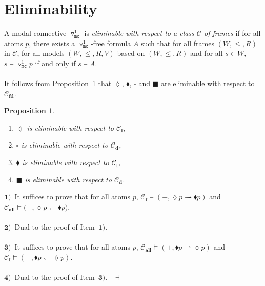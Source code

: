 \documentclass[draft]{article}
\newtheorem{proposition}{Proposition}
\newenvironment{proof}{{\bf Proof:}}{~$\dashv$\\}
\def\allfra{\mathbf{all}}
\def\fcfra{\mathbf{f}}
\def\fdcfra{\mathbf{fd}}
\def\dcfra{\mathbf{d}}
\begin{document}
\section{Eliminability}\label{section:expressivity}
%
%
A modal connective $\triangledown_{\mathtt{mc}}^{1}$ is {\em eliminable with respect to a class ${\mathcal C}$ of frames}\/ if for all atoms $p$, there exists a $\triangledown_{\mathtt{mc}}^{1}$-free formula $A$ such that for all frames $(W,{\leq},{R})$ in ${\mathcal C}$, for all models $(W,{\leq},{R},V)$ based on $(W,{\leq},{R})$ and for all $s{\in}W$, $s{\models}{\triangledown_{\mathtt{mc}}^{1}}p$ if and only if $s{\models}A$.
%
%
\\
\\
%
%
It follows from Proposition~\ref{interdefinable:1} that $\lozenge$, $\blacklozenge$, $\square$ and $\blacksquare$ are eliminable with respect to ${\mathcal C}_{\fdcfra}$.
%
%
\begin{proposition}\label{interdefinable:1}
%
%
\begin{enumerate}
%
%
\item $\lozenge$ is eliminable with respect to ${\mathcal C}_{\fcfra}$,
%
%
\item $\square$ is eliminable with respect to ${\mathcal C}_{\dcfra}$,
%
%
\item $\blacklozenge$ is eliminable with respect to ${\mathcal C}_{\fcfra}$,
%
%
\item $\blacksquare$ is eliminable with respect to ${\mathcal C}_{\dcfra}$.
%
%
\end{enumerate}
%
%
\end{proposition}
%
%
\begin{proof}
%
%
$\mathbf{1)}$~It suffices to prove that for all atoms $p$, ${\mathcal C}_{\fcfra}{\models}(+,{\lozenge}p{\rightharpoonup}{\blacklozenge}p)$ and ${\mathcal C}_{\allfra}{\models}(-,{\lozenge}p
%
%
%
%
%
%
%
$\linebreak$
%
%
%
%
%
%
{\leftharpoondown}{\blacklozenge}p)$.
%
%
\\
\\
%
%
$\mathbf{2)}$~Dual to the proof of Item~$\mathbf{1)}$.
%
%
\\
\\
%
%
$\mathbf{3)}$~It suffices to prove that for all atoms $p$, ${\mathcal C}_{\allfra}{\models}(+,{\blacklozenge}p{\rightharpoonup}{\lozenge}p)$ and ${\mathcal C}_{\fcfra}{\models}(-,{\blacklozenge}p{\leftharpoondown}{\lozenge}p)$.
%
%
\\
\\
%
%
$\mathbf{4)}$~Dual to the proof of Item~$\mathbf{3)}$.
%
%
\medskip
%
%
\end{proof}
\end{document}
